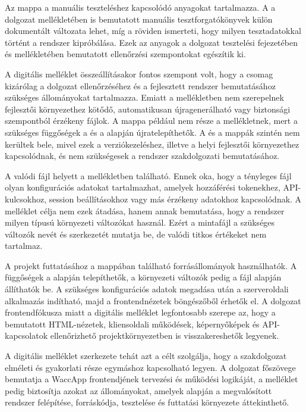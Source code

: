 Az  mappa a manuális teszteléshez kapcsolódó anyagokat tartalmazza. A  a dolgozat mellékletében is bemutatott manuális tesztforgatókönyvek külön dokumentált változata lehet, míg a  röviden ismerteti, hogy milyen tesztadatokkal történt a rendszer kipróbálása. Ezek az anyagok a dolgozat tesztelési fejezetében és mellékletében bemutatott ellenőrzési szempontokat egészítik ki.

A digitális melléklet összeállításakor fontos szempont volt, hogy a csomag kizárólag a dolgozat ellenőrzéséhez és a fejlesztett rendszer bemutatásához szükséges állományokat tartalmazza. Emiatt a mellékletben nem szerepelnek fejlesztői környezethez kötődő, automatikusan újragenerálható vagy biztonsági szempontból érzékeny fájlok. A  mappa például nem része a mellékletnek, mert a szükséges függőségek a  és a  alapján újratelepíthetők. A  és a  mappák szintén nem kerültek bele, mivel ezek a verziókezeléshez, illetve a helyi fejlesztői környezethez kapcsolódnak, és nem szükségesek a rendszer szakdolgozati bemutatásához.

A valódi  fájl helyett a mellékletben  található. Ennek oka, hogy a tényleges  fájl olyan konfigurációs adatokat tartalmazhat, amelyek hozzáférési tokenekhez, API-kulcsokhoz, session beállításokhoz vagy más érzékeny adatokhoz kapcsolódnak. A melléklet célja nem ezek átadása, hanem annak bemutatása, hogy a rendszer milyen típusú környezeti változókat használ. Ezért a mintafájl a szükséges változók nevét és szerkezetét mutatja be, de valódi titkos értékeket nem tartalmaz.

A projekt futtatásához a  mappában található forrásállományok használhatók. A függőségek a  alapján telepíthetők, a környezeti változók pedig a  fájl alapján állíthatók be. A szükséges konfigurációs adatok megadása után a szerveroldali alkalmazás indítható, majd a frontendnézetek böngészőből érhetők el. A dolgozat frontendfókusza miatt a digitális melléklet legfontosabb szerepe az, hogy a bemutatott HTML-nézetek, kliensoldali működések, képernyőképek és API-kapcsolatok ellenőrizhető projektkörnyezetben is visszakereshetők legyenek.

A digitális melléklet szerkezete tehát azt a célt szolgálja, hogy a szakdolgozat elméleti és gyakorlati része egymáshoz kapcsolható legyen. A dolgozat főszövege bemutatja a WaccApp frontendjének tervezési és működési logikáját, a melléklet pedig biztosítja azokat az állományokat, amelyek alapján a megvalósított rendszer felépítése, forráskódja, tesztelése és futtatási környezete áttekinthető.